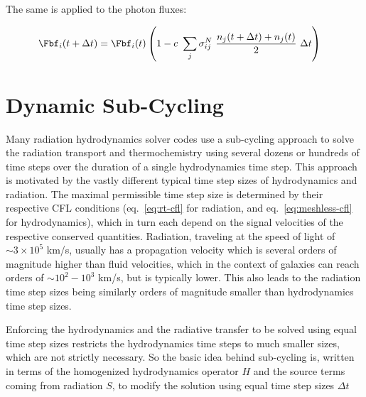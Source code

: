 The same is applied to the photon fluxes:

\begin{align}
\Fbf_i (t + \Delta t)
    &= \Fbf_i(t) \left(1 - c \ \sum_j \sigma_{i j} ^ N  \
    \frac{n_j(t + \Delta t) + n_j(t)}{2} \ \Delta t \right)
\end{align}


















\section{Dynamic Sub-Cycling}\label{chap:dynamic-sybcycling}

Many radiation hydrodynamics solver codes \citep[e.g.][]{rosdahlSPHINXCosmologicalSimulations2018,
kannanAREPORTRadiationHydrodynamics2019} use a sub-cycling approach to solve the radiation transport
and thermochemistry using several dozens or hundreds of time steps over the duration of a single
hydrodynamics time step. This approach is motivated by the vastly different typical time step sizes
of hydrodynamics and radiation. The maximal permissible time step size is determined by their
respective CFL conditions (eq.~\ref{eq:rt-cfl} for radiation, and eq.~\ref{eq:meshless-cfl} for
hydrodynamics), which in turn each depend on the signal velocities of the respective conserved
quantities. Radiation, traveling at the speed of light of $\sim 3 \times 10^5$ km/s, usually has a
propagation velocity which is several orders of magnitude higher than fluid velocities, which in
the context of galaxies can reach orders of $\sim 10^2 - 10^3$ km/s, but is typically lower. This
also leads to the radiation time step sizes being similarly orders of magnitude smaller than
hydrodynamics time step sizes.

Enforcing the hydrodynamics and the radiative transfer to be solved using equal time step sizes
restricts the hydrodynamics time steps to much smaller sizes, which are not strictly necessary. So
the basic idea behind sub-cycling is, written in terms of the homogenized hydrodynamics operator $H$
and the source terms coming from radiation $S$, to modify the solution using equal time step sizes
$\Delta t$

